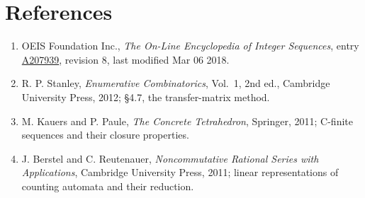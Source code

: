\documentclass[11pt]{article}
\theoremstyle{definition}
\begin{document}
\section{References}

\begin{enumerate}

\item OEIS Foundation Inc., \emph{The On-Line Encyclopedia of Integer Sequences}, entry \href{https://oeis.org/A207939}{A207939}, revision 8, last modified Mar 06 2018.

\item R. P. Stanley, \emph{Enumerative Combinatorics}, Vol.~1, 2nd ed., Cambridge University Press, 2012; \S4.7, the transfer-matrix method.

\item M. Kauers and P. Paule, \emph{The Concrete Tetrahedron}, Springer, 2011; C-finite sequences and their closure properties.

\item J. Berstel and C. Reutenauer, \emph{Noncommutative Rational Series with Applications}, Cambridge University Press, 2011; linear representations of counting automata and their reduction.

\end{enumerate}
\end{document}
